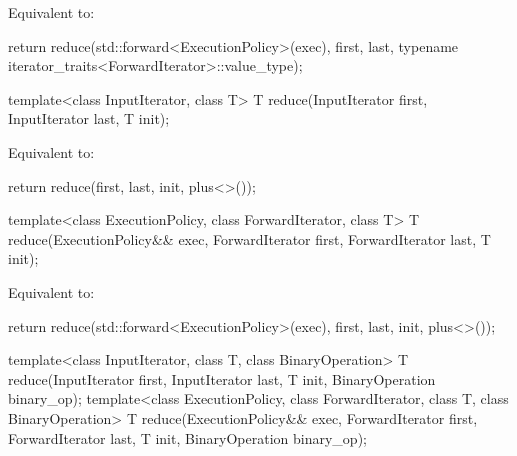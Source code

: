 \begin{itemdescr}
\pnum
\effects Equivalent to:
\begin{codeblock}
return reduce(std::forward<ExecutionPolicy>(exec), first, last,
              typename iterator_traits<ForwardIterator>::value_type{});
\end{codeblock}
\end{itemdescr}


%
\begin{itemdecl}
template<class InputIterator, class T>
  T reduce(InputIterator first, InputIterator last, T init);
\end{itemdecl}

\begin{itemdescr}
\pnum
\effects Equivalent to:
\begin{codeblock}
return reduce(first, last, init, plus<>());
\end{codeblock}
\end{itemdescr}

%
\begin{itemdecl}
template<class ExecutionPolicy, class ForwardIterator, class T>
  T reduce(ExecutionPolicy&& exec,
           ForwardIterator first, ForwardIterator last, T init);
\end{itemdecl}

\begin{itemdescr}
\pnum
\effects Equivalent to:
\begin{codeblock}
return reduce(std::forward<ExecutionPolicy>(exec), first, last, init, plus<>());
\end{codeblock}
\end{itemdescr}


%
\begin{itemdecl}
template<class InputIterator, class T, class BinaryOperation>
  T reduce(InputIterator first, InputIterator last, T init,
           BinaryOperation binary_op);
template<class ExecutionPolicy, class ForwardIterator, class T, class BinaryOperation>
  T reduce(ExecutionPolicy&& exec,
           ForwardIterator first, ForwardIterator last, T init,
           BinaryOperation binary_op);
\end{itemdecl}

